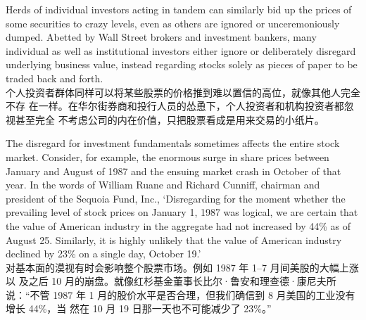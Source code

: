 \begin{verseparallel}
  {
    Herds of individual investors acting in tandem can similarly bid up the
    prices of some securities to crazy levels, even as others are ignored or
    unceremoniously dumped. Abetted by Wall Street brokers and investment
    bankers, many individual as well as institutional investors either ignore or
    deliberately disregard underlying business value, instead regarding stocks
    solely as pieces of paper to be traded back and forth. \\
  }
  {
    个人投资者群体同样可以将某些股票的价格推到难以置信的高位，就像其他人完全不存
    在一样。在华尔街券商和投行人员的怂恿下，个人投资者和机构投资者都忽视甚至完全
    不考虑公司的内在价值，只把股票看成是用来交易的小纸片。
  }
\end{verseparallel}

\begin{verseparallel}
  {
    The disregard for investment fundamentals sometimes affects the entire stock
    market. Consider, for example, the enormous surge in share prices between
    January and August of 1987 and the ensuing market crash in October of that
    year. In the words of William Ruane and Richard Cunniff, chairman and
    president of the Sequoia Fund, Inc., `Disregarding for the moment whether
    the prevailing level of stock prices on January 1, 1987 was logical, we are
    certain that the value of American industry in the aggregate had not
    increased by 44\% as of August 25. Similarly, it is highly unlikely that the
    value of American industry declined by 23\% on a single day, October 19.' \\
  }
  {
    对基本面的漠视有时会影响整个股票市场。例如 1987 年 1--7 月间美股的大幅上涨以
    及之后 10 月的崩盘。就像红杉基金董事长比尔·鲁安和理查德·康尼夫所说：“不管
    1987 年 1 月的股价水平是否合理，但我们确信到 8 月美国的工业没有增长 44\%，当
    然在 10 月 19 日那一天也不可能减少了 23\%。”
  }
\end{verseparallel}

